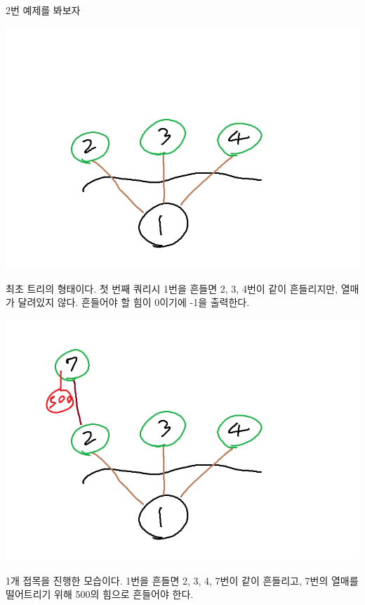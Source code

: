 2번 예제를 봐보자
\begin{center}

\includegraphics[scale=0.5]{3img.png}

\end{center} 
최초 트리의 형태이다. 첫 번째 쿼리시 1번을 흔들면 2, 3, 4번이 같이 흔들리지만, 열매가 달려있지 않다. 흔들어야 할 힘이 0이기에 -1을 출력한다.
\begin{center}

\includegraphics[scale=0.5]{4img.png}

\end{center} 
1개 접목을 진행한 모습이다. 1번을 흔들면 2, 3, 4, 7번이 같이 흔들리고, 7번의 열매를 떨어트리기 위해 500의 힘으로 흔들어야 한다.
